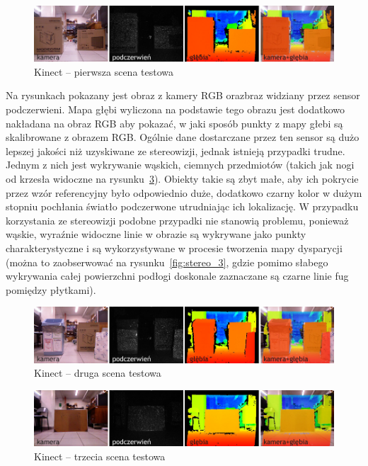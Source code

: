 \begin{figure}[h!]
\centering
\includegraphics{../../Common/img/kinect_1}
\caption[Kinect -- pierwsza scena testowa]{Kinect -- pierwsza scena testowa}
\label{fig:kinect_1}
\end{figure}

Na rysunkach pokazany jest obraz z kamery RGB orazbraz widziany przez sensor
podczerwieni. Mapa głębi wyliczona na podstawie tego obrazu jest dodatkowo nakładana
na obraz RGB aby pokazać, w jaki sposób punkty z mapy głebi są skalibrowane z obrazem RGB.
Ogólnie dane dostarczane przez ten sensor są dużo lepszej jakości niż uzyskiwane
ze stereowizji, jednak istnieją przypadki trudne. Jednym z nich jest wykrywanie
wąskich, ciemnych przedmiotów (takich jak nogi od krzesła widoczne na
rysunku~\ref{fig:kinect_3}). Obiekty takie są zbyt małe, aby ich pokrycie przez
wzór referencyjny było odpowiednio duże, dodatkowo czarny kolor w dużym stopniu
pochłania światło podczerwone utrudniając ich lokalizację. W przypadku
korzystania ze stereowizji podobne przypadki nie stanowią problemu, ponieważ
wąskie, wyraźnie widoczne linie w obrazie są wykrywane jako punkty charakterystyczne
i są wykorzystywane w procesie tworzenia mapy dysparycji (można to zaobserwować
na rysunku~\ref{fig:stereo_3}, gdzie pomimo słabego wykrywania całej powierzchni
podłogi doskonale zaznaczane są czarne linie fug pomiędzy płytkami).

\begin{figure}[h!]
\centering
\includegraphics{../../Common/img/kinect_2}
\caption[Kinect -- druga scena testowa]{Kinect -- druga scena testowa}
\label{fig:kinect_2}
\end{figure}

\begin{figure}[h!]
\centering
\includegraphics{../../Common/img/kinect_3}
\caption[Kinect -- trzecia scena testowa]{Kinect -- trzecia scena testowa}
\label{fig:kinect_3}
\end{figure}
